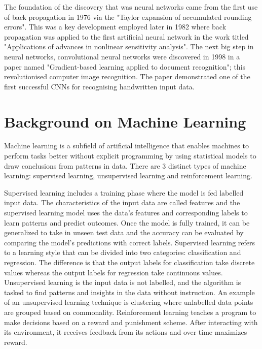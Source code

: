 \documentclass[twocolumn,pra,floatfix]{revtex4-2}
\begin{document}
        The foundation of the discovery that was neural networks came from the first use of back propagation in 1976 via the "Taylor expansion of accumulated rounding errors"\cite{nn}.
        This was a key development employed  later in 1982 where back propagation was applied to the first artificial neural network in the work titled "Applications of advances in nonlinear sensitivity analysis"\cite{grad-desc}.
        The next big step in neural networks, convolutional neural networks were discovered in 1998 in a paper named "Gradient-based learning applied to document recognition"\cite{cnn}; this revolutionised computer image recognition. The paper demonstrated one of the first successful CNNs for recognising handwritten input data.

    \section{Background on Machine Learning}

        Machine learning is a subfield of artificial intelligence that enables machines to perform tasks better without explicit programming by using statistical models to draw conclusions from patterns in data. There are 3 distinct types of machine learning: supervised learning, unsupervised learning and reinforcement learning.

        Supervised learning includes a training phase where the model is fed labelled input data. The characteristics of the input data are called features and the supervised learning model uses the data's features and corresponding labels to learn patterns and predict outcomes. Once the model is fully trained, it can be generalized to take in unseen test data and the accuracy can be evaluated by comparing the model’s predictions with correct labels. Supervised learning refers to a learning style that can be divided into two categories: classification and regression. The difference is that the output labels for classification take discrete values whereas the output labels for regression take continuous values. Unsupervised learning is the input data is not labelled, and the algorithm is tasked to find patterns and insights in the data without instruction. An example of an unsupervised learning technique is clustering where unlabelled data points are grouped based on commonality. Reinforcement learning teaches a program to make decisions based on a reward and punishment scheme. After interacting with its environment, it receives feedback from its actions and over time maximizes reward.
        
\end{document}
